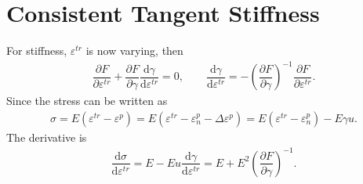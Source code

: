 \documentclass[a4paper,10pt,fleqn]{article}
\newcommand*{\md}[1]{\mathrm{d}#1}
\newcommand*{\pfrac}[2]{\dfrac{\partial#1}{\partial#2}}
\newcommand*{\ddfrac}[2]{\dfrac{\md#1}{\md#2}}
\begin{document}
\section{Consistent Tangent Stiffness}
For stiffness, $\varepsilon^{tr}$ is now varying, then
\begin{gather}
\pfrac{F}{\varepsilon^{tr}}+\pfrac{F}{\gamma}\ddfrac{\gamma}{\varepsilon^{tr}}=0,\qquad\ddfrac{\gamma}{\varepsilon^{tr}}=-\left(\pfrac{F}{\gamma}\right)^{-1}\pfrac{F}{\varepsilon^{tr}}.
\end{gather}
Since the stress can be written as
\begin{gather}
\sigma=E(\varepsilon^{tr}-\varepsilon^p)=E(\varepsilon^{tr}-\varepsilon^p_n-\Delta\varepsilon^p)=E(\varepsilon^{tr}-\varepsilon^p_n)-E\gamma{}u.
\end{gather}
The derivative is
\begin{gather}
\ddfrac{\sigma}{\varepsilon^{tr}}=E-Eu\ddfrac{\gamma}{\varepsilon^{tr}}=E+E^2\left(\pfrac{F}{\gamma}\right)^{-1}.
\end{gather}
\end{document}
